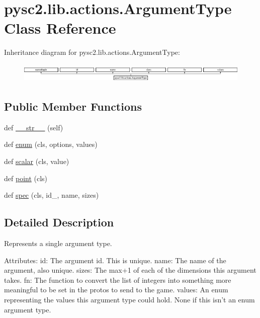 \hypertarget{classpysc2_1_1lib_1_1actions_1_1_argument_type}{}\section{pysc2.\+lib.\+actions.\+Argument\+Type Class Reference}
\label{classpysc2_1_1lib_1_1actions_1_1_argument_type}
Inheritance diagram for pysc2.\+lib.\+actions.\+Argument\+Type\+:\begin{figure}[H]
\begin{center}
\leavevmode
\includegraphics[height=0.928690cm]{classpysc2_1_1lib_1_1actions_1_1_argument_type}
\end{center}
\end{figure}
\subsection*{Public Member Functions}
\begin{DoxyCompactItemize}
\item 
def \mbox{\hyperlink{classpysc2_1_1lib_1_1actions_1_1_argument_type_a9adbb0aefcb2fc39e36b1c718889f9cc}{\+\_\+\+\_\+str\+\_\+\+\_\+}} (self)
\item 
def \mbox{\hyperlink{classpysc2_1_1lib_1_1actions_1_1_argument_type_a7b139c13ef12cd5bffa45c09af082140}{enum}} (cls, options, values)
\item 
def \mbox{\hyperlink{classpysc2_1_1lib_1_1actions_1_1_argument_type_a6440b4d3ca6308d338405b4dd456abab}{scalar}} (cls, value)
\item 
def \mbox{\hyperlink{classpysc2_1_1lib_1_1actions_1_1_argument_type_acd7c52464b761ade90cc6d63957a0739}{point}} (cls)
\item 
def \mbox{\hyperlink{classpysc2_1_1lib_1_1actions_1_1_argument_type_abeda01e4e7ab3656447b9b4af4ed26d3}{spec}} (cls, id\+\_\+, name, sizes)
\end{DoxyCompactItemize}


\subsection{Detailed Description}
\begin{DoxyVerb}Represents a single argument type.

Attributes:
  id: The argument id. This is unique.
  name: The name of the argument, also unique.
  sizes: The max+1 of each of the dimensions this argument takes.
  fn: The function to convert the list of integers into something more
      meaningful to be set in the protos to send to the game.
  values: An enum representing the values this argument type could hold. None
      if this isn't an enum argument type.
\end{DoxyVerb}
 


